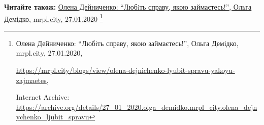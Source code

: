  
 
 
 
 

\def\pubIA{https://archive.org/details/27_01_2020.olga_demidko.mrpl_city.olena_dejnychenko_ljubit_spravu}
\def\pubTitle{Олена Дейниченко: \enquote{Любiть справу, якою займаєтесь!}}
\def\pubDate{27.01.2020}
\def\pubOrigin{https://mrpl.city/blogs/view/olena-dejnichenko-lyubit-spravu-yakoyu-zajmaetes}
\def\pubAuthor{Ольга Демідко}

\textbf{Читайте також:} \href{\pubIA}{%
\pubTitle, \pubAuthor, mrpl.city, \pubDate}%
\footnote{\pubTitle, \pubAuthor, mrpl.city, \pubDate, \par\url{\pubOrigin}, \par Internet Archive: \url{\pubIA}}
